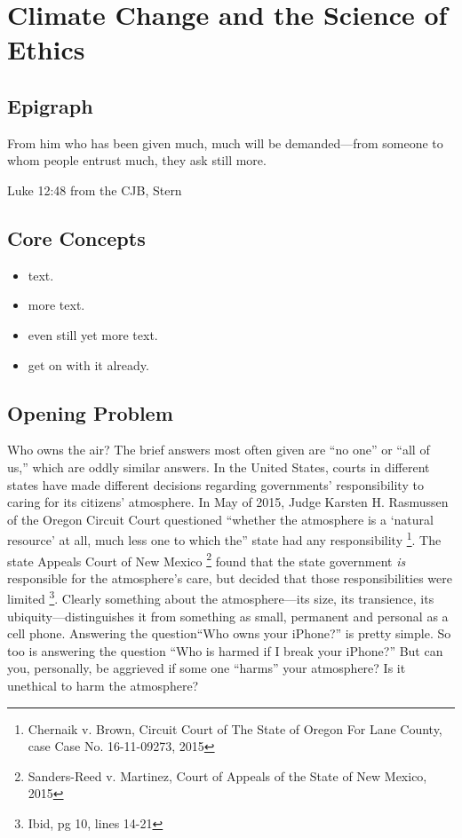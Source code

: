 \chapter{Climate Change and the Science of Ethics}\label{chap:CCEthics}
\section*{Epigraph}
\epigraph{From him who has been given much, much will be demanded---from someone to whom people entrust much, they ask still more.}{Luke 12:48 from the CJB, Stern} 

\section{Core Concepts}
\begin{itemize}
	\item	text.
	\item	more text.
	\item	even still yet more text.
	\item	get on with it already.
\end{itemize}

\section{Opening Problem} 
Who owns the air? The brief answers most often given are ``no one'' or ``all of us,'' which are oddly similar answers. In the United States, courts in different states have made different decisions regarding  governments' responsibility to caring for its citizens' atmosphere. In May of 2015, Judge Karsten H. Rasmussen of the Oregon Circuit Court questioned
``whether the atmosphere is a `natural resource' at all, much less one to which the'' state had any responsibility \footnote{Chernaik v. Brown, Circuit Court of The State of Oregon For Lane County, case Case No. 16-11-09273, 2015}. The state Appeals Court of New Mexico \footnote{Sanders-Reed v. Martinez, Court of Appeals of the State of New Mexico, 2015} found that the state government \emph{is} responsible for the atmosphere's care, but decided that those responsibilities were limited \footnote{Ibid, pg 10, lines 14-21}. Clearly something about the atmosphere---its size, its transience, its ubiquity---distinguishes it from something as small, permanent and personal as a cell phone. Answering the question``Who owns your iPhone?'' is pretty simple. So too is answering the question ``Who is harmed if I break your iPhone?'' But can you, personally, be aggrieved if some one ``harms'' your atmosphere? Is it unethical to harm the atmosphere?
 

